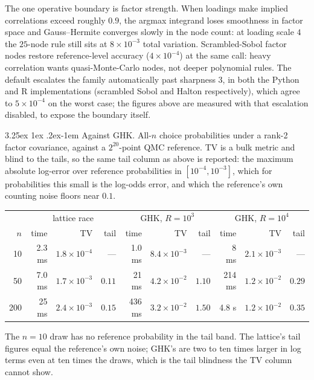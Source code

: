 \documentclass[11pt]{article}
\makeatletter
\renewcommand\paragraph{\@startsection{paragraph}{4}{\z@}%
  {3.25ex \@plus1ex \@minus.2ex}{-1em}%
  {\normalfont\normalsize\itshape}}
\makeatother
\begin{document}
The one operative boundary is factor strength. When loadings make implied
correlations exceed roughly $0.9$, the argmax integrand loses smoothness in
factor space and Gauss--Hermite converges slowly in the node count: at
loading scale $4$ the $25$-node rule still sits at $8\times10^{-3}$ total
variation. Scrambled-Sobol factor nodes restore reference-level accuracy
($4\times10^{-4}$) at the same call: heavy correlation wants
quasi-Monte-Carlo nodes, not deeper polynomial rules. The default
escalates the family automatically past sharpness $3$, in both the Python
and R implementations (scrambled Sobol and Halton respectively), which
agree to $5\times10^{-4}$ on the worst case; the figures above are
measured with that escalation disabled, to expose the boundary itself.

\paragraph{Against GHK.} All-$n$ choice probabilities under a rank-2 factor
covariance, against a $2^{20}$-point QMC reference. TV is a bulk metric and
blind to the tails, so the same tail column as above is reported: the
maximum absolute log-error over reference probabilities in
$[10^{-4},10^{-3}]$, which for probabilities this small is the log-odds
error, and which the reference's own counting noise floors near $0.1$.

\begin{center}\small
\setlength{\tabcolsep}{4pt}
\begin{tabular}{rrrrrrrrrr}
\toprule
& \multicolumn{3}{c}{lattice race} & \multicolumn{3}{c}{GHK, $R=10^3$} & \multicolumn{3}{c}{GHK, $R=10^4$}\\
$n$ & time & TV & tail & time & TV & tail & time & TV & tail\\
\midrule
10  & 2.3 ms & $1.8\times10^{-4}$ & --- & 1.0 ms & $8.4\times10^{-3}$ & --- & 8 ms & $2.1\times10^{-3}$ & ---\\
50  & 7.0 ms & $1.7\times10^{-3}$ & $0.11$ & 21 ms & $4.2\times10^{-2}$ & $1.10$ & 214 ms & $1.2\times10^{-2}$ & $0.29$\\
200 & 25 ms  & $2.4\times10^{-3}$ & $0.15$ & 436 ms & $3.2\times10^{-2}$ & $1.50$ & 4.8 s & $1.2\times10^{-2}$ & $0.35$\\
\bottomrule
\end{tabular}
\end{center}

The $n=10$ draw has no reference probability in the tail band. The
lattice's tail figures equal the reference's own noise; GHK's are two to
ten times larger in log terms even at ten times the draws, which is the
tail blindness the TV column cannot show.
\end{document}
